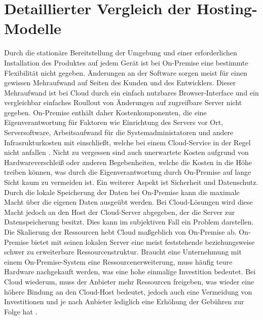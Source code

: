 \documentclass[12pt,bibtotoc]{article}
\begin{document}
	\section{Detaillierter Vergleich der Hosting-Modelle}
			Durch die stationäre Bereitstellung der Umgebung und einer erforderlichen Installation des Produktes auf jedem Gerät ist bei On-Premise eine bestimmte Flexibilität nicht gegeben.
			Änderungen an der Software sorgen meist für einen gewissen Mehraufwand auf Seiten des Kunden und des Entwicklers. Dieser Mehraufwand ist bei Cloud durch ein einfach nutzbares Browser-Interface und ein vergleichbar einfaches Roullout von Änderungen auf zugreifbare Server nicht gegeben. 
			On-Premise enthält daher Kostenkomponenten, die eine Eigenverantwortung für Faktoren wie Einrichtung des Servers vor Ort, Serversoftware, Arbeitsaufwand für die Systemadministatoren und andere Infrasrukturkosten mit einschließt, welche bei einem Cloud-Service in der Regel nicht anfallen \cite{Fisher.2018}.
			Nicht zu vergessen sind auch unerwartete Kosten aufgrund von Hardwareverschleiß oder anderen Begebenheiten, welche die Kosten in die Höhe treiben können, was durch die Eigenverantwortung durch On-Premise auf lange Sicht kaum zu vermeiden ist.
			\newline
			Ein weiterer Aspekt ist Sicherheit und Datenschutz. Durch die lokale Speicherung der Daten bei On-Premise kann die maximale Macht über die eigenen Daten ausgeübt werden. 
			Bei Cloud-Lösungen wird diese Macht jedoch an den Host der Cloud-Server abgegeben, der die Server zur Datenspeicherung besitzt. Dies kann im subjektiven Fall ein Problem darstellen. 
			\newline
			Die Skalierung der Ressourcen hebt Cloud maßgeblich von On-Premise ab. On-Premise bietet mit seinen lokalen Server eine meist feststehende beziehungsweise schwer zu erweiterbare Ressourcenstruktur. Braucht eine Unternehmung mit einem On-Premise-System eine 
			Ressourcenerweiterung, muss häufig teure Hardware nachgekauft werden, was eine hohe einmalige Investition bedeutet.
			Bei Cloud wiederum, muss der Anbieter mehr Ressourcen freigeben, was wieder eine höhere Bindung an den Cloud-Host bedeutet, jedoch auch eine Vermeidung von Investitionen und je nach Anbieter lediglich eine Erhöhung der Gebühren zur Folge hat \cite{Murugesan.2016}.
			\newline
\end{document}
